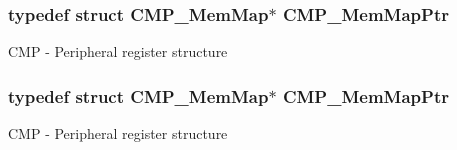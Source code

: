 \subsubsection[{\texorpdfstring{C\+M\+P\+\_\+\+Mem\+Map\+Ptr}{CMP_MemMapPtr}}]{\setlength{\rightskip}{0pt plus 5cm}typedef struct {\bf C\+M\+P\+\_\+\+Mem\+Map}$\ast$ {\bf C\+M\+P\+\_\+\+Mem\+Map\+Ptr}}\hypertarget{group___c_m_p___peripheral_ga6f5d370df3839e41b771c2d0b89cbb83}{}\label{group___c_m_p___peripheral_ga6f5d370df3839e41b771c2d0b89cbb83}
C\+MP -\/ Peripheral register structure 
\subsubsection[{\texorpdfstring{C\+M\+P\+\_\+\+Mem\+Map\+Ptr}{CMP_MemMapPtr}}]{\setlength{\rightskip}{0pt plus 5cm}typedef struct {\bf C\+M\+P\+\_\+\+Mem\+Map}$\ast$ {\bf C\+M\+P\+\_\+\+Mem\+Map\+Ptr}}\hypertarget{group___c_m_p___peripheral_ga6f5d370df3839e41b771c2d0b89cbb83}{}\label{group___c_m_p___peripheral_ga6f5d370df3839e41b771c2d0b89cbb83}
C\+MP -\/ Peripheral register structure 